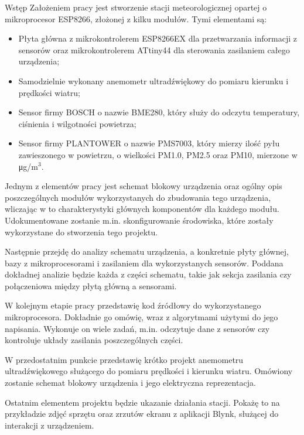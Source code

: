 \documentclass[12pt,a4paper]{scrartcl}
\begin{document}
\begin{section}	{\fontsize{14pt}{16.8pt} \tytulyrozdzialow Wstęp}
	\hspace{\parindent} Założeniem pracy jest stworzenie stacji meteorologicznej opartej o mikroprocesor ESP8266, złożonej z kilku modułów. Tymi elementami są:
	\begin{itemize}{}{}
		\item Płyta główna z mikrokontrolerem ESP8266EX dla przetwarzania informacji z sensorów oraz mikrokontrolerem ATtiny44 dla sterowania zasilaniem całego urządzenia;
		\item Samodzielnie wykonany anemometr ultradźwiękowy do pomiaru kierunku i prędkości wiatru;
		\item Sensor firmy BOSCH o nazwie BME280, który służy do odczytu temperatury, ciśnienia i wilgotności powietrza;
		\item Sensor firmy PLANTOWER o nazwie PMS7003, który mierzy ilość pyłu zawieszonego w powietrzu, o wielkości PM1.0, PM2.5 oraz PM10, mierzone w \si\micro g/m$^{3}$.
	\end{itemize}
	\par Jednym z elementów pracy jest schemat blokowy urządzenia oraz ogólny opis poszczególnych modułów wykorzystanych do zbudowania tego urządzenia, wliczając w to charakterystyki głównych komponentów dla każdego modułu. Udokumentowane zostanie m.in. skonfigurowanie środowiska, które zostały wykorzystane do stworzenia tego projektu.
	\par Następnie przejdę do analizy schematu urządzenia, a konkretnie płyty głównej, bazy z mikroprocesorami i zasilaniem dla wykorzystanych sensorów. Poddana dokładnej analizie będzie każda z części schematu, takie jak sekcja zasilania czy połączeniowa między płytą główną a sensorami.
	\par W kolejnym etapie pracy przedstawię kod źródłowy do wykorzystanego mikroprocesora. Dokładnie go omówię, wraz z algorytmami użytymi do jego napisania. Wykonuje on wiele zadań, m.in. odczytuje dane z sensorów czy kontroluje układy zasilania poszczególnych części.
	\par W przedostatnim punkcie przedstawię krótko projekt anemometru ultradźwiękowego służącego do pomiaru prędkości i kierunku wiatru. Omówiony zostanie schemat blokowy urządzenia i jego elektryczna reprezentacja.
	\par Ostatnim elementem projektu będzie ukazanie działania stacji. Pokażę to na przykładzie zdjęć sprzętu oraz zrzutów ekranu z aplikacji Blynk, służącej do interakcji z urządzeniem.
\end{section}
\end{document}
